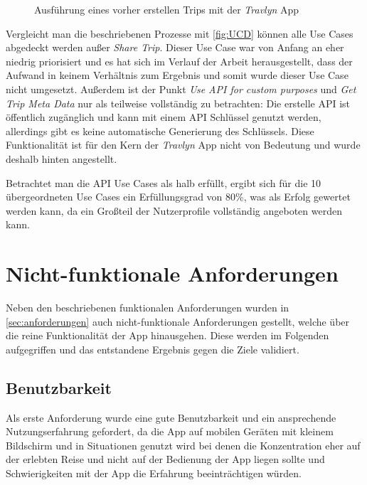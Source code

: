 \begin{itemize}
\begin{figure}[ht!]
		\caption{Ausführung eines vorher erstellen Trips mit der \textit{Travlyn} App}
		\label{fig:ui_trip_execution}
	\end{figure}
    
\end{itemize}

Vergleicht man die beschriebenen Prozesse mit \autoref{fig:UCD} können alle Use Cases abgedeckt werden außer \textit{Share Trip}. Dieser Use Case war von Anfang an eher niedrig priorisiert und es hat sich im Verlauf der Arbeit herausgestellt, dass der Aufwand in keinem Verhältnis zum Ergebnis und somit wurde dieser Use Case nicht umgesetzt. Außerdem ist der Punkt \textit{Use API for custom purposes} und \textit{Get Trip Meta Data} nur als teilweise vollständig zu betrachten: Die erstelle API ist öffentlich zugänglich und kann mit einem API Schlüssel genutzt werden, allerdings gibt es keine automatische Generierung des Schlüssels. Diese Funktionalität ist für den Kern der \textit{Travlyn} App nicht von Bedeutung und wurde deshalb hinten angestellt.

\vspace{0.25cm}

Betrachtet man die API Use Cases als halb erfüllt, ergibt sich für die 10 übergeordneten Use Cases ein Erfüllungsgrad von 80\%, was als Erfolg gewertet werden kann, da ein Großteil der Nutzerprofile vollständig angeboten werden kann.

\section{Nicht-funktionale Anforderungen}
Neben den beschriebenen funktionalen Anforderungen wurden in \autoref{sec:anforderungen} auch nicht-funktionale Anforderungen gestellt, welche über die reine Funktionalität der App hinausgehen. Diese werden im Folgenden aufgegriffen und das entstandene Ergebnis gegen die Ziele validiert.

	\subsection{Benutzbarkeit}
	Als erste Anforderung wurde eine gute Benutzbarkeit und ein ansprechende Nutzungserfahrung gefordert, da die App auf mobilen Geräten mit kleinem Bildschirm und in Situationen genutzt wird bei denen die Konzentration eher auf der erlebten Reise und nicht auf der Bedienung der App liegen sollte und Schwierigkeiten mit der App die Erfahrung beeinträchtigen würden.
	
